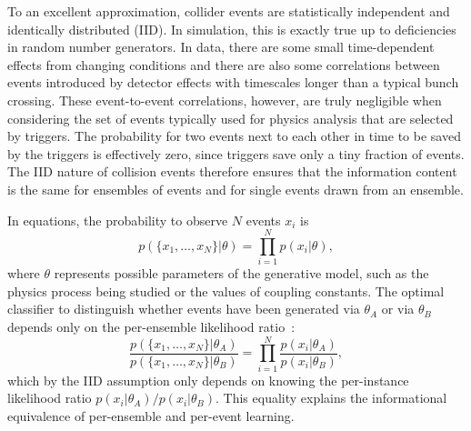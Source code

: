 \documentclass[aps,prx,reprint,preprintnumbers,superscriptaddress,nofootinbib,longbibliography,floatfix]{revtex4-2}
\newcommand{\thetaup}{\theta_A}
\newcommand{\thetadown}{\theta_B}
\begin{document}
To an excellent approximation, collider events are statistically independent and identically distributed (IID).
%
In simulation, this is exactly true up to deficiencies in random number generators.
%
In data, there are some small time-dependent effects from changing conditions and there are also some correlations between events introduced by detector effects with timescales longer than a typical bunch crossing.
%
These event-to-event correlations, however, are truly negligible when considering the set of events typically used for physics analysis that are selected by triggers.
%
The probability for two events next to each other in time to be saved by the triggers is effectively zero, since triggers save only a tiny fraction of events.
%
The IID nature of collision events therefore ensures that the information content is the same for ensembles of events and for single events drawn from an ensemble.


In equations, the probability to observe $N$ events $x_i$ is
%
\begin{equation}
\label{eq:iid_prob_relation}
p(\{x_1, \ldots, x_N\} | \theta) = \prod_{i = 1}^N p(x_i | \theta),
\end{equation}
%
where $\theta$ represents possible parameters of the generative model, such as the physics process being studied or the values of coupling constants.
%
The optimal classifier to distinguish whether events have been generated via $\thetaup$ or via $\thetadown$ depends only on the per-ensemble likelihood ratio~\cite{neyman1933ix}:
%
\begin{equation}
\label{eq:iid_lr_relation}
\frac{p(\{x_1, \ldots, x_N \}| \thetaup)}{p(\{x_1, \ldots, x_N \}| \thetadown)} = \prod_{i = 1}^N \frac{p(x_i | \thetaup)}{p(x_i | \thetadown)},
\end{equation}
%
which by the IID assumption only depends on knowing the per-instance likelihood ratio $p(x_i | \thetaup)/p(x_i | \thetadown)$.
%
This equality explains the informational equivalence of per-ensemble and per-event learning. 
\end{document}
